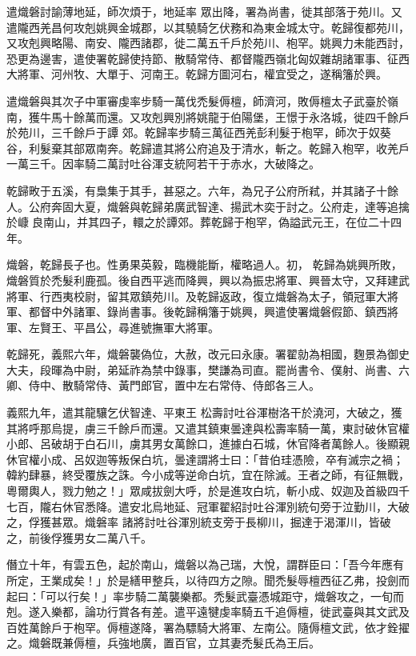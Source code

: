 \begin{pinyinscope}
 遣熾磐討諭薄地延，師次煩于，地延率
 眾出降，署為尚書，徙其部落于苑川。又遣隴西羌昌何攻剋姚興金城郡，以其驍騎乞伏務和為東金城太守。乾歸復都苑川，又攻剋興略陽、南安、隴西諸郡，徙二萬五千戶於苑川、枹罕。姚興力未能西討，恐更為邊害，遣使署乾歸使持節、散騎常侍、都督隴西嶺北匈奴雜胡諸軍事、征西大將軍、河州牧、大單于、河南王。乾歸方圖河右，權宜受之，遂稱籓於興。



 遣熾磐與其次子中軍審虔率步騎一萬伐禿髮傉檀，師濟河，敗傉檀太子武臺於嶺南，獲牛馬十餘萬而還。又攻剋興別將姚龍于伯陽堡，王憬于永洛城，徙四千餘戶於苑川，三千餘戶于譚
 郊。乾歸率步騎三萬征西羌彭利髮于枹罕，師次于奴葵谷，利髮棄其部眾南奔。乾歸遣其將公府追及于清水，斬之。乾歸入枹罕，收羌戶一萬三千。因率騎二萬討吐谷渾支統阿若干于赤水，大破降之。



 乾歸畋于五溪，有梟集于其手，甚惡之。六年，為兄子公府所弒，并其諸子十餘人。公府奔固大夏，熾磐與乾歸弟廣武智達、揚武木奕于討之。公府走，達等追擒於嵻良南山，并其四子，轘之於譚郊。葬乾歸于枹罕，偽謚武元王，在位二十四年。



 熾磐，乾歸長子也。性勇果英毅，臨機能斷，權略過人。初，
 乾歸為姚興所敗，熾磐質於禿髮利鹿孤。後自西平逃而降興，興以為振忠將軍、興晉太守，又拜建武將軍、行西夷校尉，留其眾鎮苑川。及乾歸返政，復立熾磐為太子，領冠軍大將軍、都督中外諸軍、錄尚書事。後乾歸稱籓于姚興，興遣使署熾磐假節、鎮西將軍、左賢王、平昌公，尋進號撫軍大將軍。



 乾歸死，義熙六年，熾磐襲偽位，大赦，改元曰永康。署翟勍為相國，麴景為御史大夫，段暉為中尉，弟延祚為禁中錄事，樊謙為司直。罷尚書令、僕射、尚書、六卿、侍中、散騎常侍、黃門郎官，置中左右常侍、侍郎各三人。



 義熙九年，遣其龍驤乞伏智達、平東王
 松壽討吐谷渾樹洛干於澆河，大破之，獲其將呼那烏提，虜三千餘戶而還。又遣其鎮東曇達與松壽率騎一萬，東討破休官權小郎、呂破胡于白石川，虜其男女萬餘口，進據白石城，休官降者萬餘人。後顯親休官權小成、呂奴迦等叛保白坑，曇達謂將士曰：「昔伯珪憑險，卒有滅宗之禍；韓約肆暴，終受覆族之誅。今小成等逆命白坑，宜在除滅。王者之師，有征無戰，粵爾輿人，戮力勉之！」眾咸拔劍大呼，於是進攻白坑，斬小成、奴迦及首級四千七百，隴右休官悉降。遣安北烏地延、冠軍翟紹討吐谷渾別統句旁于泣勤川，大破之，俘獲甚眾。熾磐率
 諸將討吐谷渾別統支旁于長柳川，掘達于渴渾川，皆破之，前後俘獲男女二萬八千。



 僭立十年，有雲五色，起於南山，熾磐以為己瑞，大悅，謂群臣曰：「吾今年應有所定，王業成矣！」於是繕甲整兵，以待四方之隙。聞禿髮辱檀西征乙弗，投劍而起曰：「可以行矣！」率步騎二萬襲樂都。禿髮武臺憑城距守，熾磐攻之，一旬而剋。遂入樂都，論功行賞各有差。遣平遠犍虔率騎五千追傉檀，徙武臺與其文武及百姓萬餘戶于枹罕。傉檀遂降，署為驃騎大將軍、左南公。隨傉檀文武，依才銓擢之。熾磐既兼傉檀，兵強地廣，置百官，立其妻禿髮氏為王后。




\end{pinyinscope}
